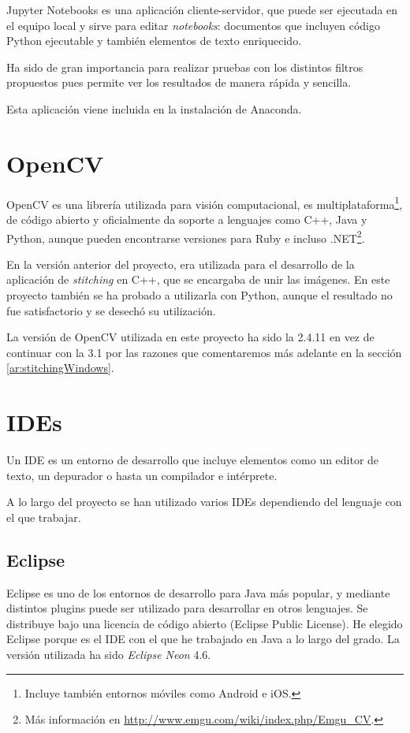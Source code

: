 Jupyter Notebooks \cite{jupyterNotebook} es una aplicación cliente-servidor, que puede ser ejecutada en el equipo local y sirve para editar \textit{notebooks}: documentos que incluyen código Python ejecutable y también elementos de texto enriquecido.

Ha sido de gran importancia para realizar pruebas con los distintos filtros propuestos pues permite ver los resultados de manera rápida y sencilla.

Esta aplicación viene incluida en la instalación de Anaconda.

\section{OpenCV} \label{th:OpenCV}
OpenCV \cite{OpenCVManual} es una librería utilizada para visión computacional, es multiplataforma\footnote{Incluye también entornos móviles como Android e iOS.}, de código abierto y oficialmente da soporte a lenguajes como C++, Java y Python, aunque pueden encontrarse versiones para Ruby e incluso .NET\footnote{Más información en \url{http://www.emgu.com/wiki/index.php/Emgu_CV}.}.

En la versión anterior \cite{perikymataV1} del proyecto, era utilizada para el desarrollo de la aplicación de \textit{stitching} en C++, que se encargaba de unir las imágenes. En este proyecto también se ha probado a utilizarla con Python, aunque el resultado no fue satisfactorio y se desechó su utilización.

La versión de OpenCV utilizada en este proyecto ha sido la 2.4.11 en vez de continuar con la 3.1 por las razones que comentaremos más adelante en la sección \ref{ar:stitchingWindows}.


\section{IDEs}
Un IDE es un entorno de desarrollo que incluye elementos como un editor de texto, un depurador o hasta un compilador e intérprete.

A lo largo del proyecto se han utilizado varios IDEs dependiendo del lenguaje con el que trabajar.

\subsection{Eclipse} \label{th:Eclipse}
Eclipse es uno de los entornos de desarrollo para Java más popular, y mediante distintos plugins puede ser utilizado para desarrollar en otros lenguajes. Se distribuye bajo una licencia de código abierto (Eclipse Public License). He elegido Eclipse porque es el IDE con el que he trabajado en Java a lo largo del grado. La versión utilizada ha sido \textit{Eclipse Neon} 4.6.

